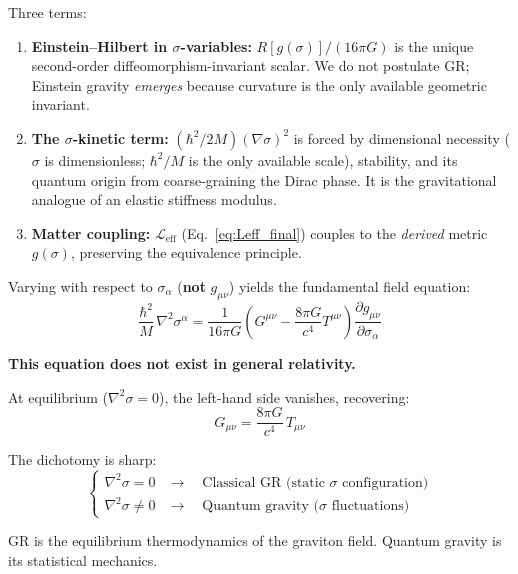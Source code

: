 \documentclass[11pt,a4paper]{article}
\theoremstyle{definition}
\theoremstyle{remark}
\begin{document}
	Three terms:
	\begin{enumerate}
		\item \textbf{Einstein--Hilbert in $\sigma$-variables:} $R[g(\sigma)]/(16\pi G)$ is the unique second-order diffeomorphism-invariant scalar.  We do not postulate GR; Einstein gravity \emph{emerges} because curvature is the only available geometric invariant.
		\item \textbf{The $\sigma$-kinetic term:} $(\hbar^2/2M)(\nabla\sigma)^2$ is forced by dimensional necessity ($\sigma$ is dimensionless; $\hbar^2/M$ is the only available scale), stability, and its quantum origin from coarse-graining the Dirac phase.  It is the gravitational analogue of an elastic stiffness modulus.
		\item \textbf{Matter coupling:} $\mathcal{L}_{\mathrm{eff}}$ (Eq.~\eqref{eq:Leff_final}) couples to the \emph{derived} metric $g(\sigma)$, preserving the equivalence principle.
	\end{enumerate}
	
	Varying with respect to $\sigma_\alpha$ (\textbf{not} $g_{\mu\nu}$) yields the fundamental field equation:
	\begin{equation}
		\boxed{\frac{\hbar^2}{M}\,\nabla^2\sigma^\alpha = \frac{1}{16\pi G}\!\left(G^{\mu\nu} - \frac{8\pi G}{c^4}T^{\mu\nu}\right)\frac{\partial g_{\mu\nu}}{\partial\sigma_\alpha}}
		\label{eq:sigma_field_eq}
	\end{equation}
	
	\textbf{This equation does not exist in general relativity.}
	
	At equilibrium ($\nabla^2\sigma = 0$), the left-hand side vanishes, recovering:
	\begin{equation}
		\boxed{G_{\mu\nu} = \frac{8\pi G}{c^4}\,T_{\mu\nu}}
	\end{equation}
	
	The dichotomy is sharp:
	\begin{equation}
		\begin{cases}
			\nabla^2\sigma = 0 &\longrightarrow\quad\text{Classical GR (static $\sigma$ configuration)} \\[4pt]
			\nabla^2\sigma \neq 0 &\longrightarrow\quad\text{Quantum gravity ($\sigma$ fluctuations)}
		\end{cases}
	\end{equation}
	
	GR is the equilibrium thermodynamics of the graviton field.  Quantum gravity is its statistical mechanics.

\end{document}
